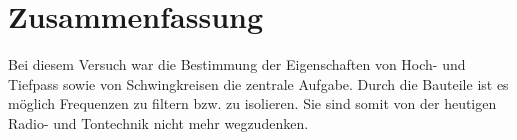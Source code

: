 \documentclass[a4paper,usenatbib]{aspdoc}
\begin{document}
       
       
    \section{Zusammenfassung}\label{sec:conclusion}
        Bei diesem Versuch war die Bestimmung der Eigenschaften von Hoch- und Tiefpass sowie von Schwingkreisen die zentrale Aufgabe. Durch die Bauteile ist es möglich Frequenzen zu filtern bzw. zu isolieren. Sie sind somit von der heutigen Radio- und Tontechnik nicht mehr wegzudenken. 



    
    
    


    \appendix
\end{document}
